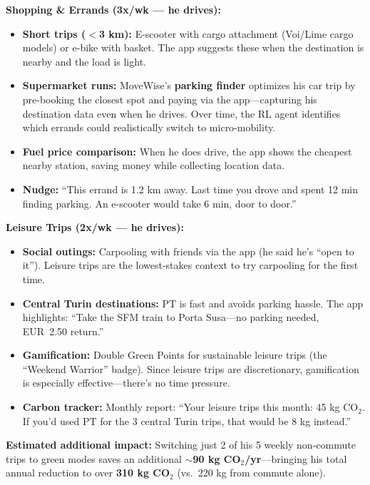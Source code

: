 \documentclass[11pt,a4paper]{article}
\begin{document}
\begin{tcolorbox}[colback=lightyellow,colframe=deeporange,title=\textbf{MoveWise Solutions for Non-Commute Trips}]
\textbf{Shopping \& Errands (3x/wk --- he drives):}
\begin{itemize}[noitemsep]
    \item \textbf{Short trips ($<$3 km):} E-scooter with cargo attachment (Voi/Lime cargo models) or e-bike with basket. The app suggests these when the destination is nearby and the load is light.
    \item \textbf{Supermarket runs:} MoveWise's \textbf{parking finder} optimizes his car trip by pre-booking the closest spot and paying via the app---capturing his destination data even when he drives. Over time, the RL agent identifies which errands could realistically switch to micro-mobility.
    \item \textbf{Fuel price comparison:} When he does drive, the app shows the cheapest nearby station, saving money while collecting location data.
    \item \textbf{Nudge:} ``This errand is 1.2 km away. Last time you drove and spent 12 min finding parking. An e-scooter would take 6 min, door to door.''
\end{itemize}

\textbf{Leisure Trips (2x/wk --- he drives):}
\begin{itemize}[noitemsep]
    \item \textbf{Social outings:} Carpooling with friends via the app (he said he's ``open to it''). Leisure trips are the lowest-stakes context to try carpooling for the first time.
    \item \textbf{Central Turin destinations:} PT is fast and avoids parking hassle. The app highlights: ``Take the SFM train to Porta Susa---no parking needed, EUR~2.50 return.''
    \item \textbf{Gamification:} Double Green Points for sustainable leisure trips (the ``Weekend Warrior'' badge). Since leisure trips are discretionary, gamification is especially effective---there's no time pressure.
    \item \textbf{Carbon tracker:} Monthly report: ``Your leisure trips this month: 45 kg CO$_2$. If you'd used PT for the 3 central Turin trips, that would be 8 kg instead.''
\end{itemize}

\textbf{Estimated additional impact:} Switching just 2 of his 5 weekly non-commute trips to green modes saves an additional \textbf{$\sim$90 kg CO$_2$/yr}---bringing his total annual reduction to over \textbf{310 kg CO$_2$} (vs.\ 220 kg from commute alone).
\end{tcolorbox}
\end{document}
